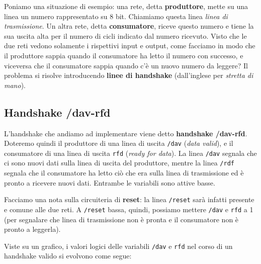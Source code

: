 \documentclass[a4paper,11pt]{article}
\begin{document}
Poniamo una situazione di esempio: una rete, detta \textbf{produttore}, mette su una linea un numero rappresentato su 8 bit.
Chiamiamo questa linea \textit{linea di trasmissione}.
Un altra rete, detta \textbf{consumatore}, riceve questo numero e tiene la sua uscita alta per il numero di cicli indicato dal numero ricevuto.
Visto che le due reti vedono solamente i rispettivi input e output, come facciamo in modo che il produttore sappia quando il consumatore ha letto il numero con successo, e viceversa che il consumatore sappia quando c'è un nuovo numero da leggere?
Il problema si risolve introducendo \textbf{linee di handshake} (dall'inglese per \textit{stretta di mano}).

\subsection{Handshake /dav-rfd}

L'handshake che andiamo ad implementare viene detto \textbf{handshake /dav-rfd}.
Doteremo quindi il produttore di una linea di uscita \lstinline|/dav| (\textit{data valid}), e il consumatore di una linea di uscita \lstinline|rfd| (\textit{ready for data}).
La linea \lstinline|/dav| segnala che ci sono nuovi dati sulla linea di uscita del produttore, mentre la linea \lstinline|/rdf| segnala che il consumatore ha letto ciò che era sulla linea di trasmissione ed è pronto a ricevere nuovi dati.
Entrambe le variabili sono attive basse.

Facciamo una nota sulla circuiteria di \textbf{reset}: la linea \lstinline|/reset| sarà infatti presente e comune alle due reti.
A \lstinline|/reset| bassa, quindi, possiamo mettere \lstinline|/dav| e \lstinline|rfd| a 1 (per segnalare che linea di trasmissione non è pronta e il consumatore non è pronto a leggerla).

Viste su un grafico, i valori logici delle variabili \lstinline|/dav| e \lstinline|rfd| nel corso di un handshake valido si evolvono come segue:

\begin{center}
\end{center}
\end{document}
